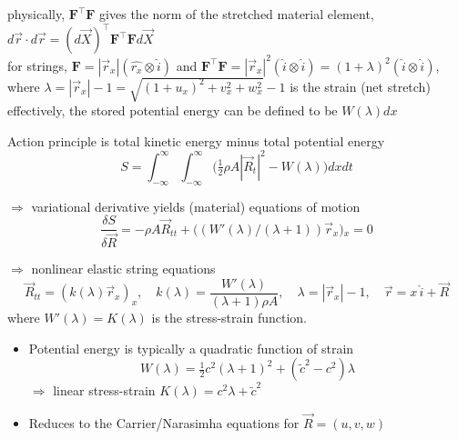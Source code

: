 \documentclass[landscape]{slides}
\begin{document}
physically, $\mathbf{F}^\top \mathbf{F}$ gives the norm of the stretched material element, 
$d\vec{r} \cdot d\vec{r} = (d\vec{X})^\top \mathbf{F}^\top \mathbf{F} d\vec{X}$
\\

for strings,
$\mathbf{F} = |\vec{r}_x| (\widehat{r_x} \otimes \hat{i})$
and
$\mathbf{F}^\top \mathbf{F} = |\vec{r}_x|^2 (\hat{i} \otimes \hat{i}) 
= (1 + \lambda)^2 (\hat{i} \otimes \hat{i})$,
where 
$\lambda = |\vec{r}_x|-1
= \sqrt{(1 + u_x)^2 + v_x^2 + w_x^2} - 1$ 
is the strain (net stretch)
\\

effectively, the stored potential energy can be defined to be 
$W(\lambda) dx$

\newpage

Action principle is total kinetic energy minus total potential energy 
\[
S = \int_{-\infty}^{\infty} \int_{-\infty}^{\infty} \big( \tfrac{1}{2}\rho A |\vec{R}_t|^2 -W(\lambda) \big) dx dt
\]

$\Longrightarrow$ variational derivative yields (material) equations of motion
\[
\frac{\delta S}{\delta \vec{R}} = -\rho A \vec{R}_{tt} + \big( (W'(\lambda)/(\lambda+1)) \vec{r}_x \big){}_x =0
\]

$\Longrightarrow$ nonlinear elastic string equations 
\[
\vec{R}_{tt}  = ( k(\lambda) \vec{r}_x )_x ,
\quad
k(\lambda) = \frac{W'(\lambda)}{(\lambda+1)\rho A},
\quad
\lambda = |\vec{r}_x|-1,
\quad
\vec{r} = x\,\hat{i} +\vec{R}
\]
where $W'(\lambda) = K(\lambda)$ is the stress-strain function. 
\\

\begin{itemize}
\item
Potential energy is typically a quadratic function of strain
\[
W(\lambda) = \tfrac{1}{2} c^2 (\lambda+1)^2 + ({\tilde c}^2 - c^2) \lambda
\]
$\Longrightarrow$ linear stress-strain $K(\lambda) = c^2 \lambda + {\tilde c}^2$
\item
Reduces to the Carrier/Narasimha equations for $\vec{R}=(u,v,w)$ 
\end{itemize}
\end{document}
